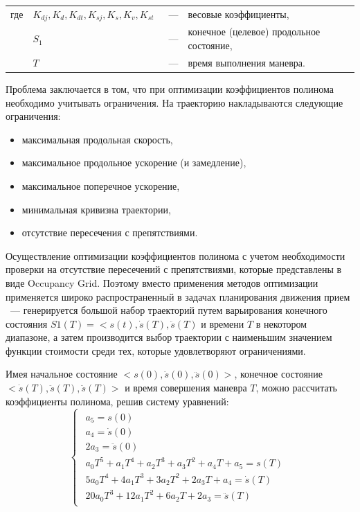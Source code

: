 \noindent\begin{tabularx}{\linewidth}{lllX}
      где & $K_{dj}, K_d, K_{dt}, K_{sj}, K_s, K_v, K_{st}$ &~---& весовые коэффициенты, \\
          & $S_1$                                           &~---& конечное (целевое) продольное состояние, \\
          & $T$                                             &~---& время выполнения маневра. \\
\end{tabularx}

Проблема заключается в том, что при оптимизации коэффициентов полинома необходимо учитывать ограничения. На траекторию
накладываются следующие ограничения:
\begin{itemize}
      \item максимальная продольная скорость,
      \item максимальное продольное ускорение (и замедление),
      \item максимальное поперечное ускорение,
      \item минимальная кривизна траектории,
      \item отсутствие пересечения с препятствиями.
\end{itemize}

Осуществление оптимизации коэффициентов полинома с учетом необходимости проверки на отсутствие пересечений с
препятствиями, которые представлены в виде Occupancy Grid. Поэтому вместо применения методов оптимизации применяется
широко распространенный в задачах планирования движения прием ~--- генерируется большой набор траекторий путем
варьирования конечного состояния $S1(T) = <s(t), \dot{s}(T), \ddot{s}(T)$ и времени $T$ в некотором диапазоне, а затем
производится выбор траектории с наименьшим значением функции стоимости среди тех, которые удовлетворяют ограничениями.

Имея начальное состояние $<s(0), \dot{s}(0), \ddot{s}(0)>$, конечное состояние $<\dot{s}(T), \ddot{s}(T), \ddot{s}(T)>$
и время совершения маневра $T$, можно рассчитать коэффициенты полинома, решив систему уравнений:
\begin{equation}
      \label{eq:solve_quintic}
      \begin{cases}
            \begin{array}
                  {lcl} a_5 = s(0) \\
                        a_4 = \dot{s}(0) \\
                        2a_3 = \ddot{s}(0) \\
                        a_0T^5   + a_1T^4 + a_2T^3 + a_3T^2 + a_4T + a_5 = s(T) \\
                        5a_0T^4  + 4a_1T^3 + 3a_2T^2 + 2a_3T + a_4 = \dot{s}(T)\\
                        20a_0T^3 + 12a_1T^2 + 6a_2T + 2a_3 = \ddot{s}(T)
            \end{array}
      \end{cases}
\end{equation}

